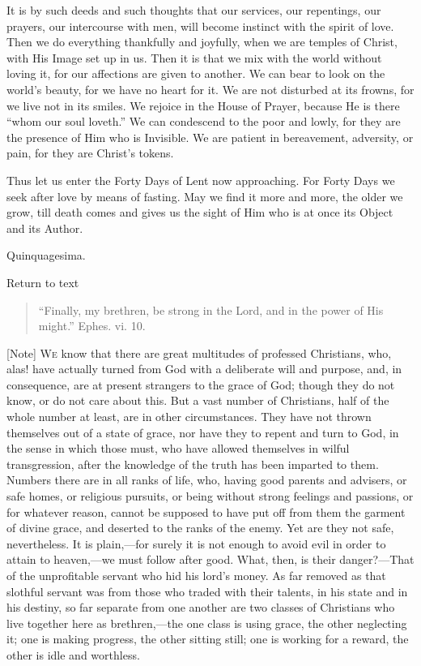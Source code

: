 It is by such deeds and such thoughts that our services, our
repentings, our prayers, our intercourse with men, will become
instinct with the spirit of love. Then we do everything thankfully and
joyfully, when we are temples of Christ, with His Image set up in us.
Then it is that we mix with the world without loving it, for our
affections are given to another. We can bear to look on the world's
beauty, for we have no heart for it. We are not disturbed at its
frowns, for we live not in its smiles. We rejoice in the House of
Prayer, because He is there ``whom our soul loveth.'' We can
condescend to the poor and lowly, for they are the presence of Him who
is Invisible. We are patient in bereavement, adversity, or pain, for
they are Christ's tokens.

Thus let us enter the Forty Days of Lent now approaching. For Forty
Days we seek after love by means of fasting. May we find it more and
more, the older we grow, till death comes and gives us the sight of
Him who is at once its Object and its Author.


Quinquagesima.

Return to text


\begin{quote}

``Finally, my brethren, be strong in the Lord, and in the
power of His might.'' Ephes. vi. 10.

\end{quote}

[Note] W\textsc{e} know that there are
great multitudes of professed Christians, who, alas! have actually
turned from God with a deliberate will and purpose, and, in
consequence, are at present strangers to the grace of God; though they
do not know, or do not care about this. But a vast number of
Christians, half of the whole number at least, are in other
circumstances. They have not thrown themselves out of a state of
grace, nor have they to repent and turn to God, in the sense in which
those must, who have allowed themselves in wilful transgression, after
the knowledge of the truth has been imparted to them. Numbers there
are in all ranks of life, who, having good parents and advisers, or
safe homes, or religious pursuits, or being without strong feelings
and passions, or for whatever reason, cannot be supposed to have put
off from them the garment of divine grace, and deserted to the ranks
of the enemy. Yet are they not safe, nevertheless. It is plain,—for
surely it is not enough to avoid evil in order to attain to heaven,—we
must follow after good. What, then, is their danger?—That of the
unprofitable servant who hid his lord's money. As far removed as that
slothful servant was from those who traded with their talents, in his
state and in his destiny, so far separate from one another are two
classes of Christians who live together here as brethren,—the one
class is using grace, the other neglecting it; one is making progress,
the other sitting still; one is working for a reward, the other is
idle and worthless.

